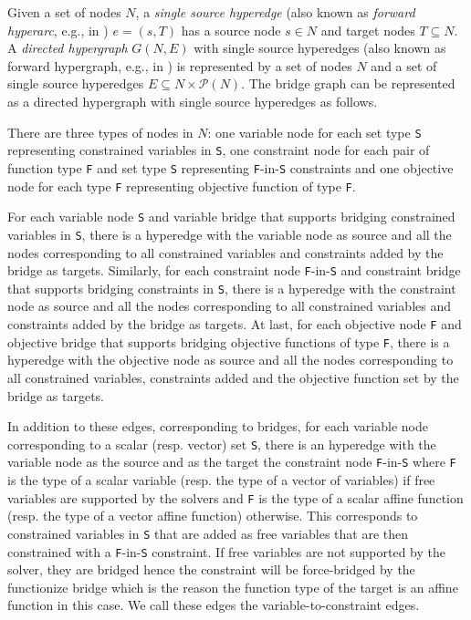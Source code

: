\documentclass[11pt,twoside,a4paper,openright]{uclouvain-thesis}
\begin{document}
Given a set of nodes $N$, a \emph{single source hyperedge} (also known as \emph{forward hyperarc}, e.g., in \cite{gallo1993directed}) $e = (s, T)$ has a source node $s \in N$ and target nodes $T \subseteq N$.
A \emph{directed hypergraph} $G(N, E)$ with single source hyperedges (also known as forward hypergraph, e.g., in \cite{gallo1993directed}) is represented by a set of nodes $N$ and a set of single source hyperedges $E \subseteq N \times \mathcal{P}(N)$.
The bridge graph can be represented as a directed hypergraph with single source hyperedges as follows.

There are three types of nodes in $N$:
one variable node for each set type \texttt{S} representing constrained variables in \texttt{S},
one constraint node for each pair of function type \texttt{F} and set type \texttt{S} representing \texttt{F}-in-\texttt{S} constraints and
one objective node for each type \texttt{F} representing objective function of type \texttt{F}.

For each variable node \texttt{S} and variable bridge that supports bridging constrained variables in \texttt{S},
there is a hyperedge with the variable node as source and all the nodes corresponding to all constrained variables and constraints added by the bridge as targets.
Similarly, for each constraint node \texttt{F}-in-\texttt{S} and constraint bridge that supports bridging constraints in \texttt{S},
there is a hyperedge with the constraint node as source and all the nodes corresponding to all constrained variables and constraints added by the bridge as targets.
At last, for each objective node \texttt{F} and objective bridge that supports bridging objective functions of type \texttt{F},
there is a hyperedge with the objective node as source and all the nodes corresponding to all constrained variables, constraints added and the objective function set by the bridge as targets.

In addition to these edges, corresponding to bridges, for each variable node corresponding to a scalar (resp. vector) set \texttt{S}, there is an hyperedge with the variable node as the source and as the target the constraint node
\texttt{F}-in-\texttt{S} where \texttt{F} is the type of a scalar variable (resp. the type of a vector of variables) if free variables are supported by the solvers and
\texttt{F} is the type of a scalar affine function (resp. the type of a vector affine function) otherwise.
This corresponds to constrained variables in \texttt{S} that are added as free variables that are then constrained with a \texttt{F}-in-\texttt{S} constraint.
If free variables are not supported by the solver, they are bridged hence the constraint will be force-bridged by the functionize bridge which is the reason the function type of the target is an affine function in this case.
We call these edges the variable-to-constraint edges.
\end{document}
